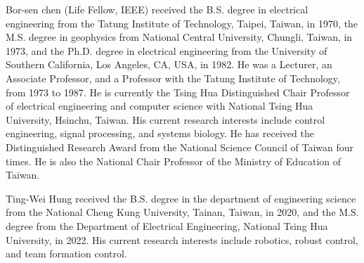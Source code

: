 \documentclass{ieeeaccess}
\begin{document}
\begin{IEEEbiography}{Bor-sen chen}
    (Life Fellow, IEEE) received the B.S. degree in electrical engineering from the Tatung Institute of Technology, Taipei, Taiwan, in 1970, the M.S. degree in geophysics from National Central University, Chungli, Taiwan, in 1973, and the Ph.D. degree in electrical engineering from the University of Southern California, Los Angeles, CA, USA, in 1982. He was a Lecturer, an Associate Professor, and a Professor with the Tatung Institute of Technology, from 1973 to 1987. He is currently the Tsing Hua Distinguished Chair Professor of electrical engineering and computer science with National Tsing Hua University, Hsinchu, Taiwan. His current research interests include control engineering, signal processing, and systems biology. He has received the Distinguished Research Award from the National Science Council of Taiwan four times. He is also the National Chair Professor of the Ministry of Education of Taiwan.
\end{IEEEbiography}
    
\begin{IEEEbiography}{Ting-Wei Hung}
    received the B.S. degree in the department of engineering science from the National Cheng Kung University, Tainan, Taiwan, in 2020, and the M.S. degree from the Department of Electrical Engineering, National Tsing Hua University, in 2022. His current research interests include robotics, robust control, and team formation control.
\end{IEEEbiography}

\EOD
\end{document}
